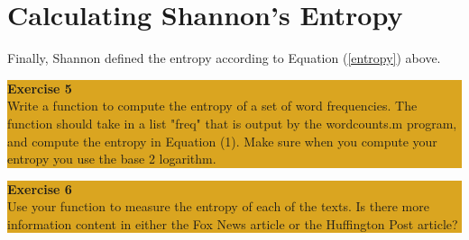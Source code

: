 \documentclass[12pt]{amsart}
\begin{document}
\section{Calculating Shannon's Entropy}

\noindent Finally, Shannon defined the entropy according to Equation (\ref{entropy}) above.

\bigskip
\begin{center}
\colorbox{Goldenrod}{\parbox{15cm}{
{
\textbf{\large Exercise 5}\vspace{1mm} \\
Write a function to compute the entropy of a set of word frequencies.  The function should take in a list "freq" that is output by the wordcounts.m program, and compute the entropy in Equation (1).   Make sure when you compute your entropy you use the base 2 logarithm.  }}}
\end{center}

\bigskip
\begin{center}
\colorbox{Goldenrod}{\parbox{15cm}{
{
\textbf{\large Exercise 6}\vspace{1mm} \\
Use your function to measure the entropy of each of the texts.  Is there more information content in either the Fox News article or the Huffington Post article?  }}}
\end{center}

%
%
\end{document}

